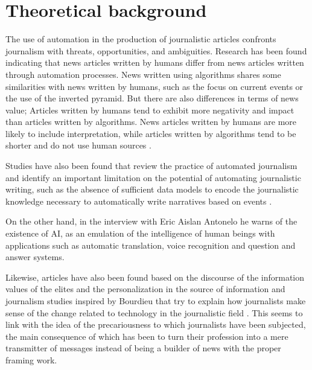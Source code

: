 \section{Theoretical background}\label{sec-theoreticalbakcground}

The use of automation in the production of journalistic articles
confronts journalism with threats, opportunities, and ambiguities.
Research has been found indicating that news articles written by humans
differ from news articles written through automation processes. News
written using algorithms shares some similarities with news written by
humans, such as the focus on current events or the use of the inverted
pyramid. But there are also differences in terms of news value; Articles
written by humans tend to exhibit more negativity and impact than
articles written by algorithms. News articles written by humans are more
likely to include interpretation, while articles written by algorithms
tend to be shorter and do not use human sources \cite{tandoc2022noticias}.

Studies have also been found that review the practice of automated
journalism and identify an important limitation on the potential of
automating journalistic writing, such as the absence of sufficient data
models to encode the journalistic knowledge necessary to automatically
write narratives based on events \cite{caswell2018automated}.

On the other hand, in the interview with Eric Aislan Antonelo \cite{rocha2019inteligencia} he warns of the existence of AI, as an emulation of the
intelligence of human beings with applications such as automatic
translation, voice recognition and question and answer systems.

Likewise, articles have also been found based on the discourse of the
information values of the elites and the personalization in the source
of information \cite{manoso2020news} and journalism studies inspired by
Bourdieu that try to explain how journalists make sense of the change
related to technology in the journalistic field \cite{lindblom2022digitalizing}. This seems to link with the idea of the precariousness
to which journalists have been subjected, the main consequence of which
has been to turn their profession into a mere transmitter of messages
instead of being a builder of news with the proper framing work.
